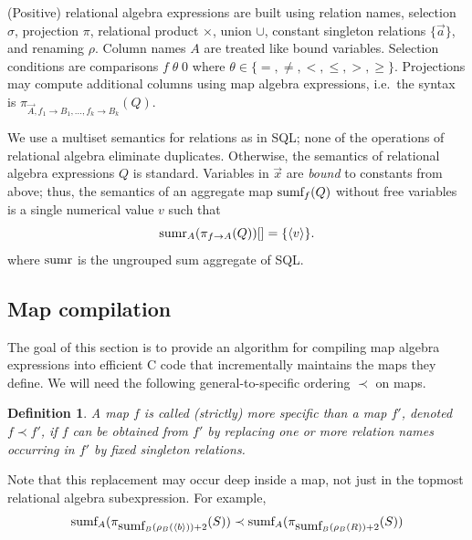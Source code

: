 \documentclass{vldb}
\newcommand{\tuple}[1]{{\langle#1\rangle}}
\newtheorem{definition}[theorem]{Definition}
\begin{document}
(Positive) relational algebra expressions are built using relation names,
selection $\sigma$, projection $\pi$, relational product $\times$, union $\cup$,
constant singleton relations $\{\vec{a}\}$,
and renaming $\rho$.
Column names $A$ are treated like bound variables.
Selection conditions are comparisons
$f \;\theta\; 0$ where $\theta \in \{ =, \neq, <, \le, >, \ge \}$.
Projections may compute additional columns
using map algebra expressions, i.e.\ the syntax is
$\pi_{\vec{A}, f_1 \rightarrow B_1, \dots, f_k \rightarrow B_k}(Q)$. 

We use a multiset semantics for relations as in SQL; none of the operations
of relational algebra eliminate duplicates.
Otherwise, the semantics of relational algebra expressions $Q$ is standard.
Variables in $\vec{x}$ are {\em bound}\/ to constants from above; thus, 
the semantics of an aggregate map $\mbox{sumf}_f(Q)$ without free variables
is a single numerical value $v$ such that
\[
\algsumr_A(\pi_{f \rightarrow A}(Q))[] = \{ \tuple{v} \}.
\]
where $\mbox{sumr}$ is the ungrouped sum aggregate of SQL.

\subsection{Map compilation}
The goal of this section is to provide an algorithm for compiling map algebra
expressions into efficient C code that incrementally maintains the
maps they define.
We will need the following general-to-specific ordering $\prec$ on maps.


\begin{definition}\em
A map $f$ is called (strictly) {\em more specific than}\/ a map $f'$,
denoted $f \prec f'$, if $f$ can be obtained from $f'$ by replacing
one or more relation names occurring in $f'$ by fixed singleton relations.
\end{definition}


Note that this replacement may occur deep inside a map, not just in the topmost
relational algebra subexpression. For example,
\[
\algsumf_A(\pi_{\algsumf_B(\rho_B(\tuple{b})) + 2}(S))
\prec
\algsumf_A(\pi_{\algsumf_B(\rho_B(R)) + 2}(S))
\]
\end{document}
